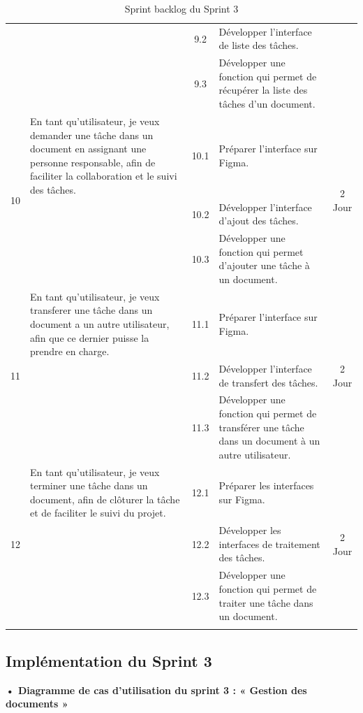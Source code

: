 \begin{adjustwidth}{-1cm}{}
\begin{longtable}{|c|p{6cm}|c|p{6cm}|c|}
      \cline{3-4}
      & & 9.2 & Développer l'interface de liste des tâches. & \\
      \cline{3-4}
      & & 9.3 & Développer une fonction qui permet de récupérer la liste des tâches d'un document. & \\
      \cline{1-5}
      \multirow{3}{*}{10} & En tant qu'utilisateur, je veux demander une tâche dans un document en assignant une personne responsable, afin de faciliter la collaboration et le suivi des tâches. & 10.1 & Préparer l'interface sur Figma. & \multirow{3}{*}{2 Jour} \\
      \cline{3-4}
      & & 10.2 & Développer l'interface d'ajout des tâches. & \\
      \cline{3-4}
      & & 10.3 & Développer une fonction qui permet d'ajouter une tâche à un document. & \\
      \cline{1-5}
      \multirow{3}{*}{11} & En tant qu'utilisateur, je veux transferer une tâche dans un document a un autre utilisateur, afin que ce dernier puisse la prendre en charge. & 11.1 & Préparer l'interface sur Figma. & \multirow{3}{*}{2 Jour} \\
      \cline{3-4}
      & & 11.2 & Développer l'interface de transfert des tâches. & \\
      \cline{3-4}
      & & 11.3 & Développer une fonction qui permet de transférer une tâche dans un document à un autre utilisateur. & \\
      \cline{1-5}
      \multirow{3}{*}{12} &En tant qu'utilisateur, je veux terminer une tâche dans un document, afin de clôturer la tâche et de faciliter le suivi du projet. & 12.1 & Préparer les interfaces sur Figma. & \multirow{3}{*}{2 Jour} \\
      \cline{3-4}
      & & 12.2 & Développer les interfaces de traitement des tâches. & \\
      \cline{3-4}
      & & 12.3 & Développer une fonction qui permet de traiter une tâche dans un document. & \\
      \cline{1-5}
  \hline
  \caption{Sprint backlog du Sprint 3}
  \label{tab:sprint-backlog-3}
\end{longtable}
\end{adjustwidth}



\subsection{Implémentation du Sprint 3}
\textbf{•	Diagramme de cas d'utilisation du sprint 3 : « Gestion des documents »}

